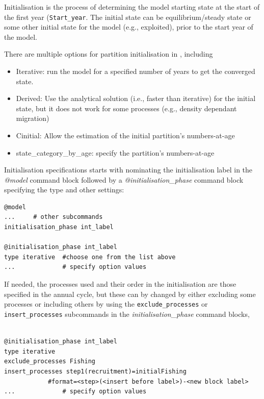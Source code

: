 \subsubsection{}\label{sec:Initialisation}

Initialisation is the process of determining the model starting state at the start of the first year (\texttt{Start\_year}. The initial state can be equilibrium/steady state or some other initial state for the model (e.g., exploited), prior to the start year of the model.

There are multiple options for partition initialisation in \CNAME, including

\begin{itemize}
	\item Iterative: run the model for a specified number of years to get the converged state.
	\item Derived: Use the analytical solution (i.e., faster than iterative) for the initial state, but it does not work for some processes (e.g., density dependant migration)
	\item Cinitial: Allow the estimation of the initial partition's numbers-at-age
	\item state\_category\_by\_age: specify the partition's numbers-at-age
\end{itemize}

Initialisation specifications starts with nominating the initialisation label in the \textit{@model} command block followed by a \textit{@initialisation\_phase} command block specifying the type and other settings:

{\small{\begin{verbatim}
@model
...     # other subcommands
initialisation_phase int_label

@initialisation_phase int_label
type iterative  #choose one from the list above
...             # specify option values

\end{verbatim}}}

If needed, the processes used and their order in the initialisation are those specified in the annual cycle, but these can by changed by either excluding some processes or including others by using the  \texttt{exclude\_processes} or  \texttt{insert\_processes} subcommands in the \textit{initialisation\_phase} command blocks,

{\small{\begin{verbatim}

@initialisation_phase int_label
type iterative
exclude_processes Fishing
insert_processes step1(recruitment)=initialFishing
            #format=<step>(<insert before label>)-<new block label>
...             # specify option values

\end{verbatim}}}

